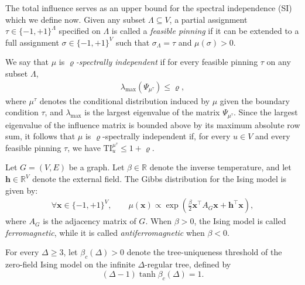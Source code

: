 \documentclass[11pt,a4paper]{article}
\theoremstyle{plain}
\let\rho=\varrho
\begin{document}
The total influence serves as an upper bound for the spectral independence (SI) which we define now.
Given any subset $\Lambda \subseteq V$, a partial assignment $\tau \in \{-1,+1\}^{\Lambda}$ specified on $\Lambda$ is called a \emph{feasible pinning} if it can be extended to a full assignment $\sigma \in\{-1,+1\}^V$ such that $\sigma_\Lambda=\tau$ and $\mu(\sigma)>0$.

We say that $\mu$ is \emph{$\rho$-spectrally independent} if for every feasible pinning $\tau$ on any subset $\Lambda$,
\begin{align*}
\lambda_{\max}(\Psi_{\mu^\tau}) \le \rho,
\end{align*}
where $\mu^{\tau}$ denotes the conditional distribution induced by $\mu$ given the boundary condition $\tau$, and $\lambda_{\max}$ is the largest eigenvalue of the matrix $\Psi_{\mu^\tau}$. Since the largest eigenvalue of the influence matrix is bounded above by its maximum absolute row sum, it follows that $\mu$ is $\rho$-spectrally independent if, for every $u\in V$ and every feasible pinning $\tau$, we have $\mathrm{TI}^{\mu^\tau}_{u}\le 1+\rho$.

Let $G=(V,E)$ be a graph. Let $\beta \in \mathbb{R}$ denote the inverse temperature, and let $\boldsymbol{h} \in \mathbb{R}^V$ denote the external field. The Gibbs distribution for the Ising model is given by:
\begin{align*}
\forall \boldsymbol{x} \in \{-1,+1\}^V, \qquad \mu(\boldsymbol{x}) \propto \exp\left(\frac{\beta}{2} \boldsymbol{x}^\intercal A_G \boldsymbol{x} + \boldsymbol{h}^\intercal \boldsymbol{x}\right),
\end{align*}
where $A_G$ is the adjacency matrix of $G$. When $\beta>0$, the Ising model is called \emph{ferromagnetic}, while it is called \emph{antiferromagnetic} when $\beta<0$.



For every $\Delta\ge 3$, let $\beta_c(\Delta)>0$ denote the tree-uniqueness threshold of the zero-field Ising model on the infinite $\Delta$-regular tree, defined by
\[
(\Delta-1)\tanh\beta_c(\Delta)=1.
\]
\end{document}
